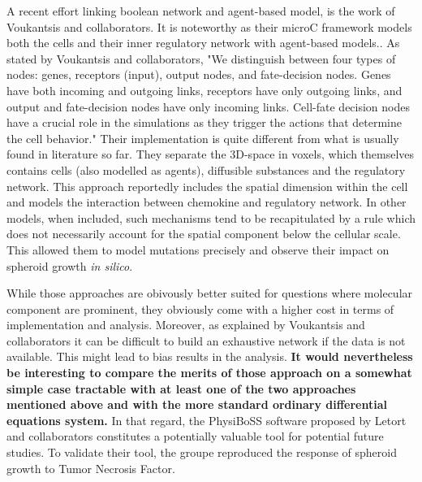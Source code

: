 \documentclass[11pt,a4paper]{article}
\begin{document}
A recent effort linking boolean network and agent-based model, is the work of Voukantsis and collaborators. It is noteworthy as their microC framework models both the cells and their inner regulatory network with agent-based models.\cite{Voukantsis2019}. As stated by Voukantsis and collaborators, "We distinguish between four types of nodes: genes, receptors (input), output nodes, and fate-decision nodes. Genes have both incoming and outgoing links, receptors have only outgoing links, and output and fate-decision nodes have only incoming links. Cell-fate decision nodes have a crucial role in the simulations as they trigger the actions that determine the cell behavior." Their implementation is quite different from what is usually found in literature so far. They separate the 3D-space in voxels, which themselves contains cells (also modelled as agents), diffusible substances and the regulatory network. This approach reportedly includes the spatial dimension within the cell and models the interaction between chemokine and regulatory network. In other models, when included, such mechanisms tend to be recapitulated by a rule which  does not necessarily account for the spatial component below the cellular scale. This allowed them to model mutations precisely and observe their impact on spheroid growth \textit{in silico}.

While those approaches are obivously better suited for questions where molecular component are prominent, they obviously come with a higher cost in terms of implementation and analysis. Moreover, as explained by Voukantsis and collaborators it can be difficult to build an exhaustive network if the data is not available. This might lead to bias results in the analysis. \textbf{It would nevertheless be interesting to compare the merits of those approach on a somewhat simple case tractable with at least one of the two approaches mentioned above and with the more standard ordinary differential equations system.} In that regard, the PhysiBoSS software proposed by Letort and collaborators constitutes a potentially valuable tool for potential future studies.\cite{Letort2018} To validate their tool, the groupe reproduced the response of spheroid growth to Tumor Necrosis Factor.

\end{document}
